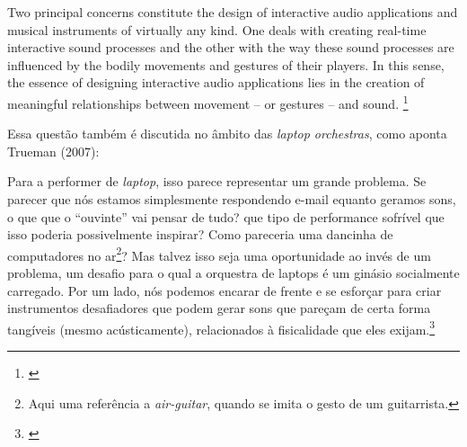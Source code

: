 \begin{citacao}
Two principal concerns constitute the design of interactive audio applications and musical instruments of virtually any kind. One deals with creating real-time interactive sound processes and the other with the way these sound processes are influenced by the bodily movements and gestures of their players. In this sense, the essence of designing interactive audio applications lies in the creation of meaningful relationships between movement – or gestures – and sound. \footnote{\cite{Schnell2013}}
\end{citacao}
Essa questão também é discutida no âmbito das \emph{laptop orchestras}, como aponta Trueman (2007):
\begin{citacao}
Para a performer de \emph{laptop}, isso parece representar um grande problema. Se parecer que nós estamos simplesmente respondendo e-mail equanto geramos sons, o que que o ``ouvinte'' vai pensar de tudo? que tipo de performance sofrível que isso poderia possivelmente inspirar? Como pareceria uma dancinha de computadores no ar\footnote{Aqui uma referência a \emph{air-guitar}, quando se imita o gesto de um guitarrista.}?
Mas talvez isso seja uma oportunidade ao invés de um problema, um desafio para o qual a orquestra de laptops é um ginásio socialmente carregado. Por um lado, nós podemos encarar de frente e se esforçar para criar instrumentos desafiadores que podem gerar sons que pareçam de certa forma tangíveis (mesmo acústicamente), relacionados à fisicalidade que eles exijam.\footnote{\cite[6]{Trueman2007}} 
\end{citacao}

